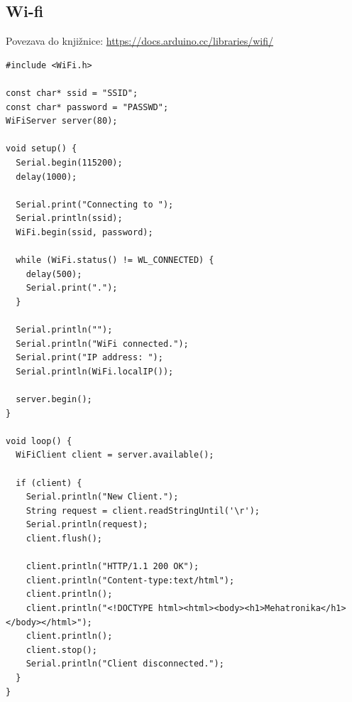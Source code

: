 \subsection{Wi-fi}
Povezava do knjižnice: \url{https://docs.arduino.cc/libraries/wifi/}
\begin{lstlisting}[language=Arduino]  
#include <WiFi.h>

const char* ssid = "SSID";
const char* password = "PASSWD";
WiFiServer server(80);

void setup() {
  Serial.begin(115200);
  delay(1000);

  Serial.print("Connecting to ");
  Serial.println(ssid);
  WiFi.begin(ssid, password);

  while (WiFi.status() != WL_CONNECTED) {
    delay(500);
    Serial.print(".");
  }

  Serial.println("");
  Serial.println("WiFi connected.");
  Serial.print("IP address: ");
  Serial.println(WiFi.localIP());

  server.begin();
}

void loop() {
  WiFiClient client = server.available(); 

  if (client) {
    Serial.println("New Client.");
    String request = client.readStringUntil('\r');
    Serial.println(request);
    client.flush();

    client.println("HTTP/1.1 200 OK");
    client.println("Content-type:text/html");
    client.println();
    client.println("<!DOCTYPE html><html><body><h1>Mehatronika</h1></body></html>");
    client.println();
    client.stop();
    Serial.println("Client disconnected.");
  }
}
\end{lstlisting}

